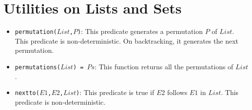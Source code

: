 \section{Utilities on Lists and Sets}
\begin{itemize}
\item \texttt{permutation($List$,$P$)}: This predicate generates a permutation $P$ of $List$. This predicate is non-deterministic. On backtracking, it generates the next permutation.
\item \texttt{permutations($List$) = $Ps$}: This function returns all the permutations of $List$.
\item \texttt{nextto($E1$,$E2$,$List$)}: This predicate is true if \texttt{$E2$} follows \texttt{$E1$} in \texttt{$List$}. This predicate is non-deterministic.
\end{itemize}

\ignore{

}
